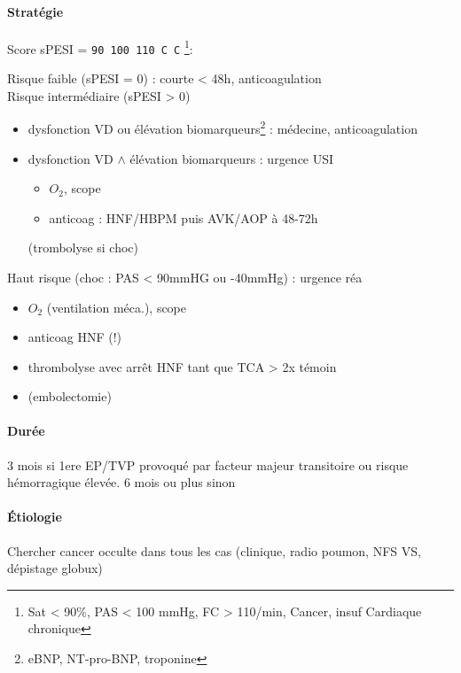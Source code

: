 \documentclass[11pt]{article}
\begin{document}
\paragraph{Stratégie}
\label{sec:org5ccf41e}
Score sPESI = \texttt{90 100 110 C C} \footnote{Sat < 90\%, PAS < 100 mmHg, FC > 110/min, Cancer, insuf Cardiaque chronique}:

Risque faible (sPESI = 0) : \faHospitalO{} courte < 48h, anticoagulation\\
Risque intermédiaire (sPESI > 0)

\begin{itemize}
\item dysfonction VD ou élévation biomarqueurs\footnote{eBNP, NT-pro-BNP, troponine} : \faHospitalO{}
médecine, anticoagulation
\item dysfonction VD \(\wedge\) élévation biomarqueurs : urgence \danger{}
\thus USI

\begin{itemize}
\item \(O_2\), scope
\item anticoag : HNF/HBPM puis AVK/AOP à 48-72h\\
\end{itemize}
(trombolyse si choc)
\end{itemize}



Haut risque (choc : PAS < 90mmHG ou -40mmHg) : urgence \faBomb \thus réa

\begin{itemize}
\item \(O_2\) (ventilation méca.), scope
\item anticoag HNF (!)
\item thrombolyse avec arrêt HNF tant que TCA > 2x témoin
\item (embolectomie)
\end{itemize}


\paragraph{Durée}
\label{sec:org375c2b3}
3 mois si 1ere EP/TVP provoqué par facteur majeur transitoire ou risque
hémorragique élevée. 6 mois ou plus sinon

\paragraph{Étiologie}
\label{sec:org504c18b}
Chercher cancer occulte dans tous les cas (clinique, radio poumon, NFS VS,
dépistage globux)
\end{document}
